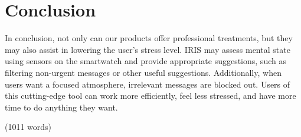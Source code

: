 \documentclass[12pt]{article}
\begin{document}
\section*{Conclusion}
In conclusion, not only can our products offer professional treatments, but they may also assist in lowering the user's stress level. IRIS may assess mental state using sensors on the smartwatch and provide appropriate suggestions, such as filtering non-urgent messages or other useful suggestions. Additionally, when users want a focused atmosphere, irrelevant messages are blocked out. Users of this cutting-edge tool can work more efficiently, feel less stressed, and have more time to do anything they want.



(1011 words)
\end{document}
